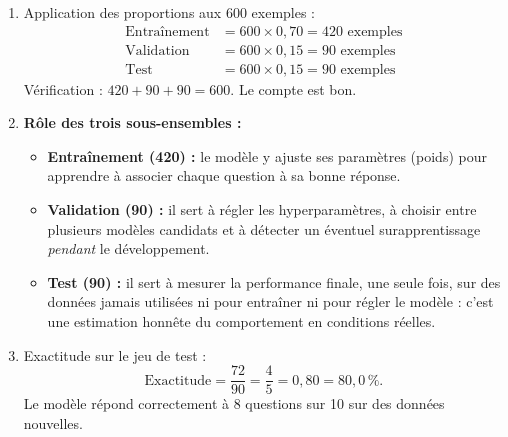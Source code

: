 \documentclass[11pt]{article}
\begin{document}
\begin{corrige}
\begin{enumerate}
\item Application des proportions aux 600 exemples :
\begin{align*}
\text{Entraînement} &= 600 \times 0,70 = 420 \text{ exemples}\\
\text{Validation} &= 600 \times 0,15 = 90 \text{ exemples}\\
\text{Test} &= 600 \times 0,15 = 90 \text{ exemples}
\end{align*}
Vérification : $420 + 90 + 90 = 600$. Le compte est bon.
\item \textbf{Rôle des trois sous-ensembles :}
\begin{itemize}
\item \textbf{Entraînement (420) :} le modèle y ajuste ses paramètres (poids) pour apprendre à associer chaque question à sa bonne réponse.
\item \textbf{Validation (90) :} il sert à régler les hyperparamètres, à choisir entre plusieurs modèles candidats et à détecter un éventuel surapprentissage \emph{pendant} le développement.
\item \textbf{Test (90) :} il sert à mesurer la performance finale, une seule fois, sur des données jamais utilisées ni pour entraîner ni pour régler le modèle : c'est une estimation honnête du comportement en conditions réelles.
\end{itemize}
\item Exactitude sur le jeu de test :
\[ \text{Exactitude} = \frac{72}{90} = \frac{4}{5} = 0,80 = 80,0\,\%. \]
Le modèle répond correctement à 8 questions sur 10 sur des données nouvelles.
\end{enumerate}
\end{corrige}
\end{document}
